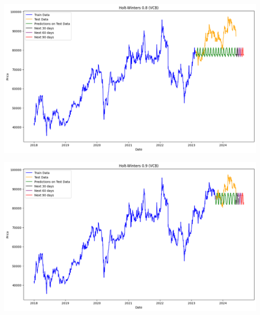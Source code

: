 \documentclass[conference]{IEEEtran}
\begin{document}
\begin{minipage}{0.21\textwidth}
    \centering
    \includegraphics[width=\linewidth]{images/Holt Winter/HW_VCB_82.png}
    \label{fig:image1}
\end{minipage}
\hfill
\begin{minipage}{0.21\textwidth}
    \centering
    \includegraphics[width=\linewidth]{images/Holt Winter/HW_VCB_91.png}
    \label{fig:image2}
\end{minipage}
\end{document}
